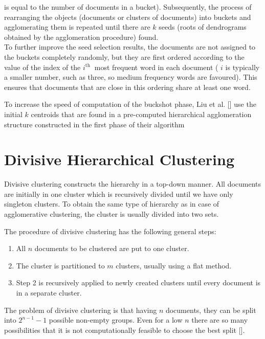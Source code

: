 \hspace{-1.5em}is equal to the number of documents in a bucket). Subsequently, the process of rearranging the objects (documents or clusters of documents) into buckets and agglomerating them is repeated until there are $k$ seeds (roots of dendrograms obtained by the agglomeration procedure) found.\\
To further improve the seed selection results, the documents are not assigned to the buckets completely randomly, but they are first ordered according to the value of the index of the $i^{\text {th }}$ most frequent word in each document ( $i$ is typically a smaller number, such as three, so medium frequency words are favoured). This ensures that documents that are close in this ordering share at least one word.

To increase the speed of computation of the buckshot phase, Liu et al. [\cite{ref180}] use the initial $k$ centroids that are found in a pre-computed hierarchical agglomeration structure constructed in the first phase of their algorithm

\section{Divisive Hierarchical Clustering}
Divisive clustering constructs the hierarchy in a top-down manner. All documents are initially in one cluster which is recursively divided until we have only singleton clusters. To obtain the same type of hierarchy as in case of agglomerative clustering, the cluster is usually divided into two sets.

The procedure of divisive clustering has the following general steps:

\begin{enumerate}
  \item All $n$ documents to be clustered are put to one cluster.
  \item The cluster is partitioned to $m$ clusters, usually using a flat method.
  \item Step 2 is recursively applied to newly created clusters until every document is in a separate cluster.
\end{enumerate}

The problem of divisive clustering is that having $n$ documents, they can be split into $2^{n-1}-1$ possible non-empty groups. Even for a low $n$ there are so many possibilities that it is not computationally feasible to choose the best split [\cite{ref285}].

